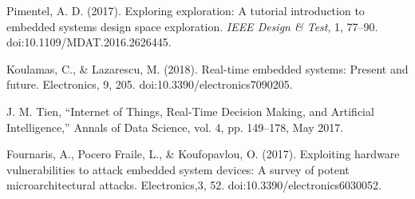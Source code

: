 \documentclass[conference]{IEEEtran}
\begin{document}
\begin{thebibliography}{00}
Pimentel, A. D. (2017). Exploring exploration: A tutorial introduction to embedded systems design space exploration. \textit{IEEE Design \& Test}, 1, 77--90. doi:10.1109/MDAT.2016.2626445.

Koulamas, C., \& Lazarescu, M. (2018). Real-time embedded systems: Present and future. Electronics, 9, 205. doi:10.3390/electronics7090205.

 J. M. Tien, 
``Internet of Things, Real-Time Decision Making, and Artificial Intelligence,'' 
Annals of Data Science, vol. 4, pp. 149--178, May 2017.

Fournaris, A., Pocero Fraile, L., \& Koufopavlou, O. (2017). Exploiting hardware vulnerabilities to attack embedded system devices: A survey of potent microarchitectural attacks. Electronics,3, 52. doi:10.3390/electronics6030052.

\end{thebibliography}


\end{document}
